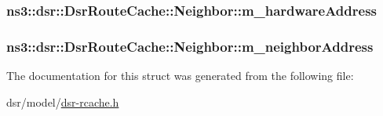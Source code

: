 \subsubsection[{\texorpdfstring{m\+\_\+hardware\+Address}{m_hardwareAddress}}]{ ns3\+::dsr\+::\+Dsr\+Route\+Cache\+::\+Neighbor\+::m\+\_\+hardware\+Address}\hypertarget{structns3_1_1dsr_1_1DsrRouteCache_1_1Neighbor_a38721f7b0158027749aceceebdd2157d}{}\label{structns3_1_1dsr_1_1DsrRouteCache_1_1Neighbor_a38721f7b0158027749aceceebdd2157d}
\subsubsection[{\texorpdfstring{m\+\_\+neighbor\+Address}{m_neighborAddress}}]{ ns3\+::dsr\+::\+Dsr\+Route\+Cache\+::\+Neighbor\+::m\+\_\+neighbor\+Address}\hypertarget{structns3_1_1dsr_1_1DsrRouteCache_1_1Neighbor_a8ee3b595da80c8519c195deaacf5f45f}{}\label{structns3_1_1dsr_1_1DsrRouteCache_1_1Neighbor_a8ee3b595da80c8519c195deaacf5f45f}


The documentation for this struct was generated from the following file\+:\begin{DoxyCompactItemize}
\item 
dsr/model/\hyperlink{dsr-rcache_8h}{dsr-\/rcache.\+h}\end{DoxyCompactItemize}
